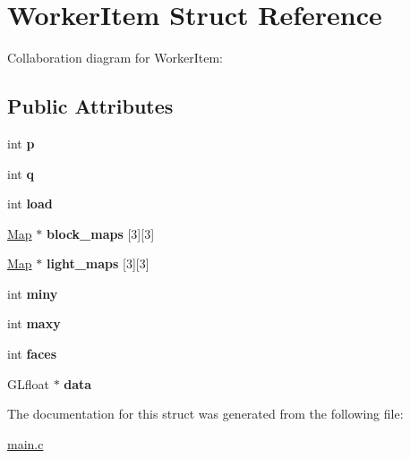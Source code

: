 \hypertarget{structWorkerItem}{}\section{Worker\+Item Struct Reference}
\label{structWorkerItem}


Collaboration diagram for Worker\+Item\+:
\subsection*{Public Attributes}
\begin{DoxyCompactItemize}
\item 
\mbox{\label{structWorkerItem_a56f8195e12033bf669e3543ac37035bf}} 
int {\bfseries p}
\item 
\mbox{\label{structWorkerItem_aca226a9caa91a2d8d8705681767607b2}} 
int {\bfseries q}
\item 
\mbox{\label{structWorkerItem_a82cdbfb0c2a6f0de3fd05a514da724d5}} 
int {\bfseries load}
\item 
\mbox{\label{structWorkerItem_a01e7ce1680490053e0fd7816ee9ceb04}} 
\hyperlink{structMap}{Map} $\ast$ {\bfseries block\+\_\+maps} \mbox{[}3\mbox{]}\mbox{[}3\mbox{]}
\item 
\mbox{\label{structWorkerItem_ac7e3900b71b86f43e953e69c5f64dc51}} 
\hyperlink{structMap}{Map} $\ast$ {\bfseries light\+\_\+maps} \mbox{[}3\mbox{]}\mbox{[}3\mbox{]}
\item 
\mbox{\label{structWorkerItem_a368c07bd7512c33c2af234b01feb2000}} 
int {\bfseries miny}
\item 
\mbox{\label{structWorkerItem_a230160dce9a2c4bfdbfe56491a7734a1}} 
int {\bfseries maxy}
\item 
\mbox{\label{structWorkerItem_a4ba610cef58e6b92862a44796ae63a50}} 
int {\bfseries faces}
\item 
\mbox{\label{structWorkerItem_af30032f39cbd48ca5bb7cc09deab7d1b}} 
G\+Lfloat $\ast$ {\bfseries data}
\end{DoxyCompactItemize}


The documentation for this struct was generated from the following file\+:\begin{DoxyCompactItemize}
\item 
\hyperlink{main_8c}{main.\+c}\end{DoxyCompactItemize}
